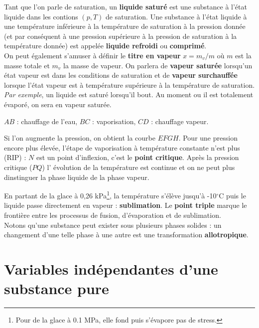Tant que l'on parle de saturation, un \textbf{liquide saturé} est une 
substance à l'état liquide dans les contions $(p,T)$ de saturation. 
Une substance à l’état liquide à une température inférieure à la 
température de saturation à la pression donnée (et par conséquent à 
une pression supérieure à la pression de saturation à la température 
donnée) est appelée \textbf{liquide refroidi} ou \textbf{comprimé}.\\

\noindent
On peut également s'amuser à définir le \textbf{titre en vapeur} $
x = m_v/m$ où $m$ est la masse totale et $m_v$ la masse de vapeur. On 
parlera de \textbf{vapeur saturée} lorsqu'un état vapeur est dans les 
conditions de saturation et de \textbf{vapeur surchauffée} lorsque 
l'état vapeur est à température supérieure à la température de 
saturation.
\newpage
\noindent
\textit{Par exemple}, un liquide est saturé lorsqu'il bout. Au moment 
ou il est totalement évaporé, on sera en vapeur saturée.

\begin{center}
$AB$ : chauffage de l'eau, $BC$ : vaporisation, $CD$ : chauffage 
vapeur.
\end{center}
Si l'on augmente la pression, on obtient la courbe $EFGH$. Pour une 
pression encore plus élevée, l'étape de vaporisation à température 
constante n'est plus (RIP) : $N$ est un point d'inflexion, c'est le 
\textbf{point critique}. Après la pression critique ($PQ$) l'
évolution de la température est continue et on ne peut plus 
dinstinguer la phase liquide de la phase vapeur. 

En partant de la glace à 0,26 kPa\footnote{Pour de la glace à 0.1 MPa, 
elle fond puis s'évapore pas de stress.}, la température s'élève jusqu'à 
-10$^\circ$C puis le liquide passe directement en vapeur : \textbf{
sublimation}. Le \textbf{point triple} marque le frontière entre 
les processus de fusion, d'évaporation et de sublimation.\\

\noindent
Notons qu'une substance peut exister sous plusieurs phases solides : 
un changement d'une telle phase à une autre est une transformation 
\textbf{allotropique}.

\section{Variables indépendantes d'une substance pure}